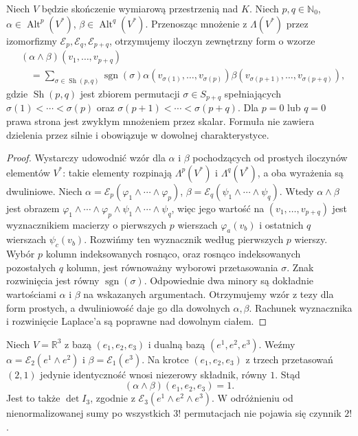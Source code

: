 \begin{wniosek}
\label{cor:lin11-shuffle}
Niech \(V\) będzie skończenie
wymiarową przestrzenią nad \(K\).
Niech \(p,q\in\mathbb N_0\),
\(\alpha\in\operatorname{Alt}^p(V^*)\),
\(\beta\in\operatorname{Alt}^q(V^*)\).
Przenosząc mnożenie z
\(\Lambda(V^*)\) przez izomorfizmy
\(\mathcal E_p,\mathcal E_q,
\mathcal E_{p+q}\), otrzymujemy
iloczyn zewnętrzny form
o wzorze
\[
 \begin{aligned}
 &(\alpha\wedge\beta)(v_1,\ldots,v_{p+q})\\
 &\quad=\sum_{\sigma\in\operatorname{Sh}(p,q)}
  \operatorname{sgn}(\sigma)
  \alpha(v_{\sigma(1)},\ldots,v_{\sigma(p)})
  \beta(v_{\sigma(p+1)},\ldots,v_{\sigma(p+q)}),
 \end{aligned}
\]
gdzie \(\operatorname{Sh}(p,q)\) jest
zbiorem permutacji \(\sigma\in S_{p+q}\)
spełniających
\(\sigma(1)<\cdots<\sigma(p)\) oraz
\(\sigma(p+1)<\cdots<\sigma(p+q)\).
Dla \(p=0\) lub \(q=0\)
prawa strona jest zwykłym
mnożeniem przez skalar.
Formuła nie zawiera dzielenia
przez silnie i obowiązuje
w dowolnej charakterystyce.
\end{wniosek}
\begin{proof}
Wystarczy udowodnić wzór
dla \(\alpha\) i \(\beta\)
pochodzących od prostych
iloczynów elementów \(V^*\):
takie elementy rozpinają
\(\Lambda^p(V^*)\) i
\(\Lambda^q(V^*)\), a oba
wyrażenia są dwuliniowe.
Niech
\(\alpha=\mathcal E_p(
 \varphi_1\wedge\cdots\wedge\varphi_p)\),
\(\beta=\mathcal E_q(
 \psi_1\wedge\cdots\wedge\psi_q)\).
Wtedy \(\alpha\wedge\beta\)
jest obrazem
\(\varphi_1\wedge\cdots\wedge\varphi_p
\wedge\psi_1\wedge\cdots\wedge\psi_q\),
więc jego wartość na
\((v_1,\ldots,v_{p+q})\)
jest wyznacznikiem macierzy
o pierwszych \(p\) wierszach
\(\varphi_a(v_b)\) i ostatnich
\(q\) wierszach \(\psi_c(v_b)\).
Rozwińmy ten wyznacznik
według pierwszych \(p\) wierszy.
Wybór \(p\) kolumn
indeksowanych rosnąco,
oraz rosnąco indeksowanych
pozostałych \(q\) kolumn,
jest równoważny wyborowi
przetasowania \(\sigma\).
Znak rozwinięcia jest równy
\(\operatorname{sgn}(\sigma)\).
Odpowiednie dwa minory
są dokładnie wartościami
\(\alpha\) i \(\beta\)
na wskazanych argumentach.
Otrzymujemy wzór z tezy
dla form prostych, a
dwuliniowość daje go dla
dowolnych \(\alpha,\beta\).
Rachunek wyznacznika i
rozwinięcie Laplace'a są
poprawne nad dowolnym ciałem.
\end{proof}

\begin{przyklad}
\label{prz:lin11-shuffle}
Niech \(V=\mathbb R^3\)
z bazą \((e_1,e_2,e_3)\)
i dualną bazą \((e^1,e^2,e^3)\).
Weźmy
\(\alpha=\mathcal E_2(e^1\wedge e^2)\)
i \(\beta=\mathcal E_1(e^3)\).
Na krotce \((e_1,e_2,e_3)\)
z trzech przetasowań \((2,1)\)
jedynie identyczność wnosi
niezerowy składnik, równy \(1\).
Stąd
\[
 (\alpha\wedge\beta)(e_1,e_2,e_3)=1.
\]
Jest to także
\(\det I_3\), zgodnie z
\(\mathcal E_3(e^1\wedge e^2\wedge e^3)\).
W odróżnieniu od
nienormalizowanej sumy po
wszystkich \(3!\) permutacjach
nie pojawia się czynnik \(2!\).
\end{przyklad}

